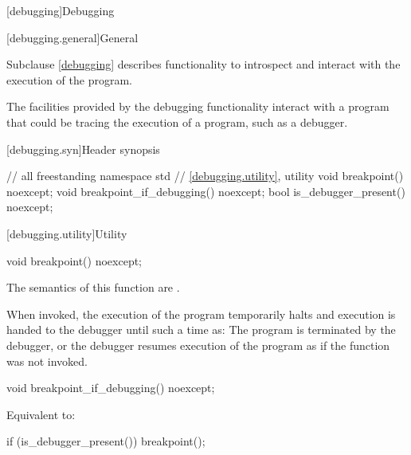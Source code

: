 [debugging]{Debugging}

[debugging.general]{General}

\pnum
Subclause \ref{debugging} describes functionality to introspect and
interact with the execution of the program.

\begin{note}
The facilities provided by the debugging functionality interact with a program
that could be tracing the execution of a \Cpp{} program, such as a debugger.
\end{note}

[debugging.syn]{Header  synopsis}

%
\begin{codeblock}
// all freestanding
namespace std {
  // \ref{debugging.utility}, utility
  void breakpoint() noexcept;
  void breakpoint_if_debugging() noexcept;
  bool is_debugger_present() noexcept;
}
\end{codeblock}

[debugging.utility]{Utility}

%
\begin{itemdecl}
void breakpoint() noexcept;
\end{itemdecl}

\begin{itemdescr}

\pnum
The semantics of this function are .

\begin{note}
When invoked, the execution of the program temporarily halts and execution is
handed to the debugger until such a time as: The program is terminated by the
debugger, or the debugger resumes execution of the program as if the function
was not invoked.
\end{note}

\end{itemdescr}

%
\begin{itemdecl}
void breakpoint_if_debugging() noexcept;
\end{itemdecl}

\begin{itemdescr}

\pnum
\effects
Equivalent to:
\begin{codeblock}
if (is_debugger_present()) breakpoint();
\end{codeblock}

\end{itemdescr}

